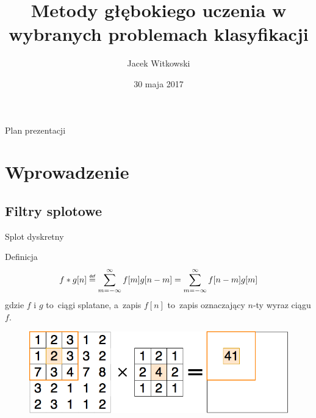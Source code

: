 \documentclass[xcolor=dvipsnames]{beamer}
\title[Obrona pracy dyplomowej]{Metody głębokiego uczenia w wybranych problemach klasyfikacji}
\subtitle[]{}
\author[J. Witkowski]{Jacek Witkowski}
\institute[Instytut Informatyki]{
  PW EiTI \\
  Instytut Informatyki \\
  promotor: mgr inż.~Rajmund Kożuszek
}
\date[Maj 2017]{30 maja 2017}
\newcommand\defeq{\mathrel{\overset{\makebox[0pt]{\mbox{\normalfont\tiny\sffamily def}}}{=}}}
\begin{document}
\begin{frame}[plain]
  \titlepage
\end{frame}

\begin{frame}{Plan prezentacji}
  \tableofcontents
\end{frame}

\section{Wprowadzenie}
\subsection{Filtry splotowe}
\begin{frame}{Splot dyskretny}
    \begin{block}{Definicja}
        \begin{equation*}
            f\ast g[n]\defeq \sum\limits_{m=-\infty}^{\infty}f[m]g[n-m] = \sum\limits_{m=-\infty}^{\infty}f[n-m]g[m]
        \end{equation*}
        gdzie $f$ i $g$ to~ciągi splatane, a~zapis $f[n]$ to~zapis oznaczający $n$-ty wyraz ciągu $f$.
    \end{block}
    \begin{figure}
		\includegraphics[width=\linewidth, keepaspectratio] {img/convolutional_filter.png}
	\end{figure}
\end{frame}
\end{document}
